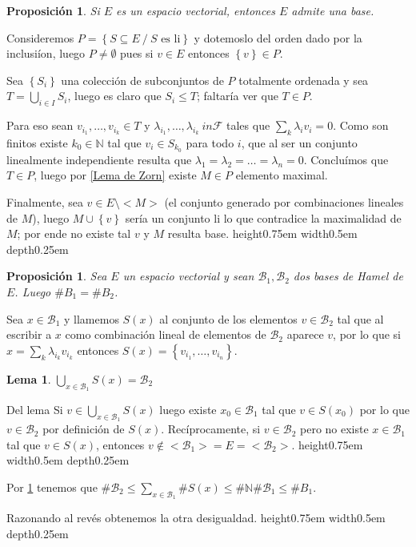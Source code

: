 \documentclass[11pt]{article}
\newcommand{\B}{\mathcal{B}}
\newcommand{\F}{\mathcal{F}}
\newcommand{\N}{{\mathbb{N}}}
\newcommand{\sett}[1]{\left\lbrace#1\right\rbrace}
\newcommand{\Bigcup}[2]{\bigcup\limits_{#1}{#2}}
\newcommand{\Bigsum}[2]{\sum\limits_{#1}{#2}}
\numberwithin{theorem}{subsection}
\newtheorem{lemma}[theorem]{Lema}
\newtheorem{proposition}[theorem]{Proposici\'on}
\newenvironment{proof}[1][Demostraci\'on]{\begin{trivlist}
		\item[\hskip \labelsep {\bfseries #1}]}{\end{trivlist}}
\newcommand{\qed}{\nobreak \ifvmode \relax \else
	\ifdim\lastskip<1.5em \hskip-\lastskip
	\hskip1.5em plus0em minus0.5em \fi \nobreak
	\vrule height0.75em width0.5em depth0.25em\fi}
\begin{document}
\begin{proposition}
	Si $E$ es un espacio vectorial, entonces $E$ admite una base.
\end{proposition}

\begin{proof}
	Consideremos $P = \sett{S \subseteq E \ / \ S \text{ es li}}$ y dotemoslo del orden dado por la inclusi\'ion, luego $P \neq \emptyset$ pues si $v \in E$ entonces $\sett{v} \in P$.
	
	Sea $\sett{S_i}$ una colecci\'on de subconjuntos de $P$ totalmente ordenada y sea $T = \Bigcup{i \in I}{S_i}$, luego es claro que $S_i \leq T$; faltar\'ia ver que $T \in P$.
	
	Para eso sean $v_{i_1}, \dots, v_{i_k} \in T$ y $\lambda_{i_1},  \dots, \lambda_{i_k} \ in \F$ tales que $\Bigsum{k}{\lambda_i v_i} = 0$. Como son finitos existe $k_0 \in \N$ tal que $v_i \in S_{k_0}$ para todo $i$, que al ser un conjunto linealmente independiente resulta que $\lambda_{1} = \lambda_{2} = \dots = \lambda_{n} = 0$. Conclu\'imos que $T \in P$, luego por \ref{Lema de Zorn} existe $M \in P$ elemento maximal.
	
	Finalmente, sea $v \in E \setminus <M>$ (el conjunto generado por combinaciones lineales de $M$), luego $M \cup \sett{v}$ ser\'ia un conjunto li lo que contradice la maximalidad de $M$; por ende no existe tal $v$ y $M$ resulta base. \qed
	
	
	
\end{proof}

\begin{proposition}
	\label{Dos bases tienen mismo cardinal, Hamel}
	Sea $E$ un espacio vectorial y sean $\B_1, \B_2$ dos bases de Hamel de $E$. Luego $\#B_1 = \#B_2$.
\end{proposition}

\begin{proof}
	Sea $x \in \B_1$ y llamemos $S(x)$ al conjunto de los elementos $v \in \B_2$ tal que al escribir a $x$ como combinaci\'on lineal de elementos de $\B_2$ aparece $v$, por lo que si $x = \Bigsum{k}{\lambda_{i_k} v_{i_k}}$ entonces $S(x) = \sett{v_{i_1}, \dots, v_{i_n}}$.
			
	\begin{lemma}
		\label{Lema de cardinalidad de bases}
		$\Bigcup{x \in \B_1}{S(x)} = \B_2$
	\end{lemma}
	\begin{proof}{Del lema}
		Si $v \in \Bigcup{x \in \B_1}{S(x)}$ luego existe $x_0 \in \B_1$ tal que $v \in S(x_0)$ por lo que $v \in \B_2$ por definici\'on de $S(x)$. Rec\'iprocamente, si $v \in \B_2$ pero no existe $x \in \B_1$ tal que $v \in S(x)$, entonces $v \not \in <\B_1> =E = <\B_2>$. \qed
	\end{proof}
	
	Por \ref{Lema de cardinalidad de bases} tenemos que $\# \B_2 \leq \Bigsum{x \in \B_1}{\#S(x)} \leq \#\N \#\B_1 \leq \#B_1$.
	
	Razonando al rev\'es obtenemos la otra desigualdad. \qed		
	
\end{proof}
\end{document}

